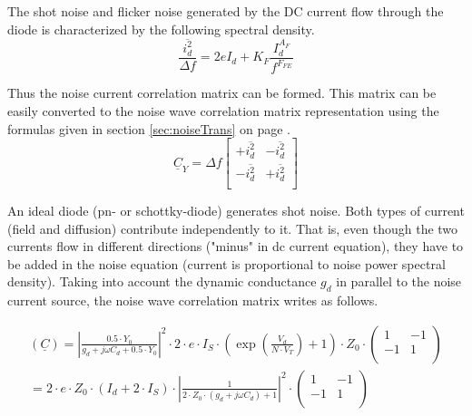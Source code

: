 The shot noise and flicker noise generated by the DC current flow
through the diode is characterized by the following spectral density.
\begin{equation}
\dfrac{\overline{i_{d}^2}}{\Delta f} = 2e I_d + K_F \dfrac{I_d^{A_F}}{f^{F_{FE}}}
\end{equation}

Thus the noise current correlation matrix can be formed.  This matrix
can be easily converted to the noise wave correlation matrix
representation using the formulas given in section
\ref{sec:noiseTrans} on page \pageref{sec:noiseTrans}.
\begin{equation}
\underline{C}_Y = \Delta f
\begin{bmatrix}
+\overline{i_{d}^2} & -\overline{i_{d}^2}\\
-\overline{i_{d}^2} & +\overline{i_{d}^2}\\
\end{bmatrix}
\end{equation}

An ideal diode (pn- or schottky-diode) generates shot noise.  Both
types of current (field and diffusion) contribute independently to it.
That is, even though the two currents flow in different directions
("minus" in dc current equation), they have to be added in the noise
equation (current is proportional to noise power spectral density).
Taking into account the dynamic conductance $g_d$ in parallel to the
noise current source, the noise wave correlation matrix writes as
follows.

\begin{equation}
\begin{split}
(\underline{C})
 =  \left| \frac{0.5\cdot Y_0}{g_d+j\omega C_d + 0.5\cdot Y_0}\right|^2  \cdot 2\cdot e\cdot I_S\cdot
    \left( \exp\left( \frac{V_{d}}{N\cdot V_T} \right) +1 \right) \cdot Z_0\cdot\begin{pmatrix}
   1 & -1\\
  -1 &  1\\
\end{pmatrix} \\
 = 2\cdot e\cdot Z_0\cdot \left(I_{d} + 2\cdot I_{S}\right)\cdot
    \left| \frac{1}{2\cdot Z_0\cdot (g_d+j\omega C_d) + 1}\right|^2 \cdot
\begin{pmatrix}
   1 & -1\\
  -1 &  1\\
\end{pmatrix}
\end{split}
\end{equation}

